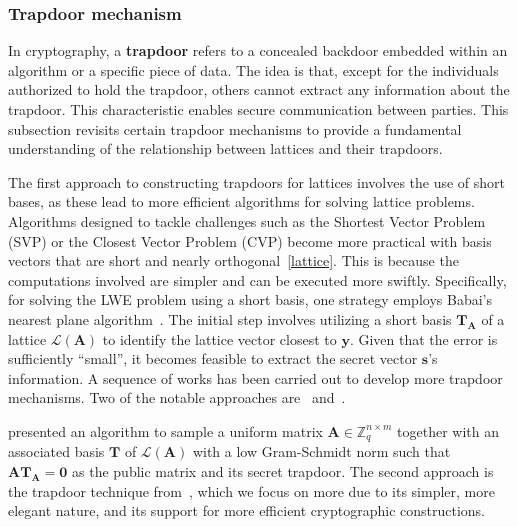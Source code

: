 \documentclass[cryptography,review,submit,pdftex,moreauthors,amsmath,amssymb,aps,strict]{Definitions/mdpi}
\begin{document}


\subsubsection{Trapdoor mechanism}

In cryptography, a \textbf{trapdoor} refers to a concealed backdoor embedded within an algorithm or a specific piece of data. The idea is that, except for the individuals authorized to hold the trapdoor, others cannot extract any information about the trapdoor. This characteristic enables secure communication between parties. This subsection revisits certain trapdoor mechanisms to provide a fundamental understanding of the relationship between lattices and their trapdoors.

The first approach to constructing trapdoors for lattices involves the use of short bases, as these lead to more efficient algorithms for solving lattice problems. Algorithms designed to tackle challenges such as the Shortest Vector Problem (SVP) or the Closest Vector Problem (CVP) become more practical with basis vectors that are short and nearly orthogonal~\ref{lattice}. This is because the computations involved are simpler and can be executed more swiftly. Specifically, for solving the LWE problem using a short basis, one strategy employs Babai's nearest plane algorithm~\cite{Babai}. The initial step involves utilizing a short basis $\mathbf{T}_{\mathbf{A}}$ of a lattice $\mathcal{L}(\mathbf{A})$ to identify the lattice vector closest to $\mathbf{y}$. Given that the error is sufficiently ``small'', it becomes feasible to extract the secret vector $\mathbf{s}$'s information. A sequence of works has been carried out to develop more trapdoor mechanisms. Two of the notable approaches are~\cite{AP09} and~\cite{MP12}.

\cite{AP09} presented an algorithm to sample a uniform matrix $\mathbf{A}\in\mathbb{Z}_q^{n\times m}$ together with an associated basis $\mathbf{T}$ of $\mathcal{L}({\mathbf{A}})$ with a low Gram-Schmidt norm such that $\mathbf{A}\mathbf{T}_{\mathbf{A}} = \mathbf{0}$ as the public matrix and its secret trapdoor. The second approach is the trapdoor technique from~\cite{MP12}, which we focus on more due to its simpler, more elegant nature, and its support for more efficient cryptographic constructions.
\end{document}
